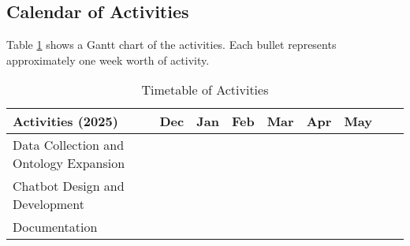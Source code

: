 \subsection{Calendar of Activities}

Table \ref{tab:timetableactivities} shows a Gantt chart of the activities.  Each bullet represents approximately
one week worth of activity.

%
%
\newcommand{\weekone}{\textbullet}
\newcommand{\weektwo}{\textbullet \textbullet}
\newcommand{\weekthree}{\textbullet \textbullet \textbullet}
\newcommand{\weekfour}{\textbullet \textbullet \textbullet \textbullet}

%
%
\begin{comment}
   \newcommand{\weekone}{$\star$}
   \newcommand{\weektwo}{$\star \star$}
   \newcommand{\weekthree}{$\star \star \star$}
   \newcommand{\weekfour}{$\star \star \star \star$ }
\end{comment}

\begin{table}[ht]   %
\centering
\caption{Timetable of Activities} \vspace{0.25em}
\begin{tabular}{|p{2in}|c|c|c|c|c|c|c|c|} \hline
\centering Activities (2025)            & Dec & Jan   & Feb & Mar & Apr & May \\ \hline
Data Collection and Ontology Expansion  &  ~~~\weekfour & \weekfour & \weekfour & \weekfour &  &  \\ \hline
Chatbot Design and Development          & & \weekfour & \weekfour & \weekfour & \weekfour & \weekthree \\ \hline
Documentation                           & ~~~\weekfour  & \weekfour & \weekfour & \weekfour & \weekfour & \weekfour \\ \hline
\end{tabular}
\label{tab:timetableactivities}
\end{table}

